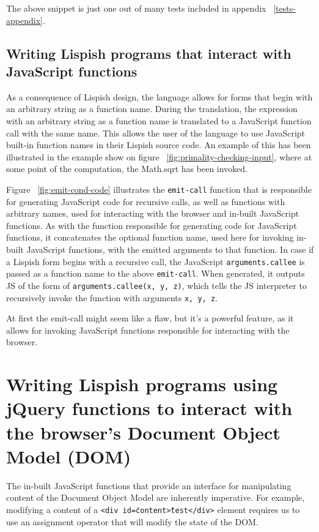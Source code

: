The above snippet is just one out of many tests included in appendix ~\ref{tests-appendix}. 

\subsection{Writing Lispish programs that interact with JavaScript functions}
As a consequence of Lispish design, the language allows for forms that begin with an arbitrary string as a function name. During the translation, the expression with an arbitrary string as a function name is translated to a JavaScript function call with the same name. This allows the user of the language to use JavaScript built-in function names in their Lispish source code. An example of this has been illustrated in the example show on figure ~\ref{fig:primality-checking-input}, where at some point of the computation, the Math.sqrt has been invoked. 



Figure ~\ref{fig:emit-cond-code} illustrates the \texttt{emit-call} function that is responsible for generating JavaScript code for recursive calls, as well as functions with arbitrary names, used for interacting with the browser and in-built JavaScript functions. 
As with the function responsible for generating code for JavaScript functions, it concatenates the optional function name, used here for invoking in-built JavaScript functions, with the emitted arguments to that function.
In case if a Lispish form begins with a recursive call, the JavaScript \texttt{arguments.callee} is passed as a function name to the above \texttt{emit-call}.
When generated, it outputs JS of the form of \texttt{arguments.callee(x, y, z)}, which tells the JS interpreter to recursively invoke the function with arguments \texttt{x, y, z}.

At first the emit-call might seem like a flaw, but it's a powerful feature, as it allows for invoking JavaScript functions responsible for interacting with the browser. 

\section{Writing Lispish programs using jQuery functions to interact with the browser's Document Object Model (DOM)}
The in-built JavaScript functions that provide an interface for manipulating content of the Document Object Model are inherently imperative.
For example, modifying a content of a \texttt{<div id=\"content\">test</div>} element requires us to use an assignment operator that will modify the state of the DOM. 

